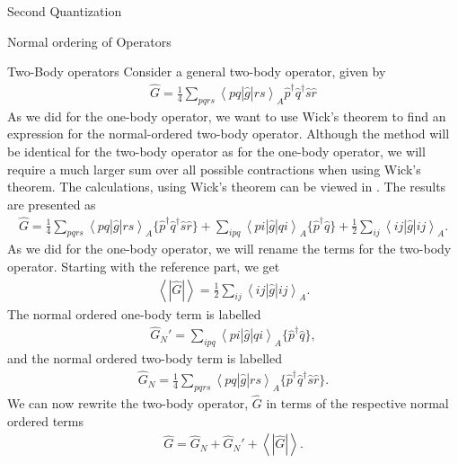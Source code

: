 \documentclass[twoside,english]{uiofysmaster}
\begin{document}
\begin{chapter}{Second Quantization}
\begin{section}{Normal ordering of Operators}
		\begin{subsection}{Two-Body operators}
			Consider a general two-body operator, given by
			\begin{align}
				\hat G = \frac{1}{4} \sum_{pqrs} \left< pq | \hat g | rs \right>_A \hat p^\dagger \hat q^\dagger \hat s \hat r
			\end{align}
			As we did for the one-body operator, we want to use Wick's theorem to find an expression for the normal-ordered two-body operator. Although the method will be identical for the two-body operator as for the one-body operator, we will require a much larger sum over all possible contractions when using Wick's theorem. The calculations, using Wick's theorem can be viewed in \cite{ShavittAndBartlett}. The results are presented as
			\begin{align}
				\hat G = \frac{1}{4} \sum_{pqrs} \left<pq | \hat g | rs\right>_A \{ \hat p^\dagger \hat q^\dagger \hat s \hat r \}+ \sum_{ipq} \left<pi |\hat g | qi\right>_A \{ \hat p^\dagger \hat q\} + \frac{1}{2} \sum_{ij} \left< ij | \hat g | ij \right>_A .
				\label{Two-Body Normal Ordering}
			\end{align}
			As we did for the one-body operator, we will rename the terms for the two-body operator. Starting with the reference part, we get
			\begin{align}
				\left< \right. | \hat G | \left.  \right> = \frac{1}{2} \sum_{ij} \left< ij | \hat g | ij \right>_A .
			\end{align}
			The normal ordered one-body term is labelled
			\begin{align}
				\hat G_N' = \sum_{ipq} \left<pi |\hat g | qi\right>_A \{ \hat p^\dagger \hat q\}, 
			\end{align}
			and the normal ordered two-body term is labelled 
			\begin{align}
				\hat G_N = \frac{1}{4} \sum_{pqrs} \left<pq | \hat g | rs\right>_A \{ \hat p^\dagger \hat q^\dagger \hat s \hat r \}.
			\end{align}
			We can now rewrite the two-body operator, $\hat G$ in terms of the respective normal ordered terms
			\begin{align}
				\hat G = \hat G_N + \hat G_N' + \left< \right. | \hat G | \left.  \right>.
			\end{align}
		\end{subsection}
	\end{section}


\end{chapter}
\end{document}
